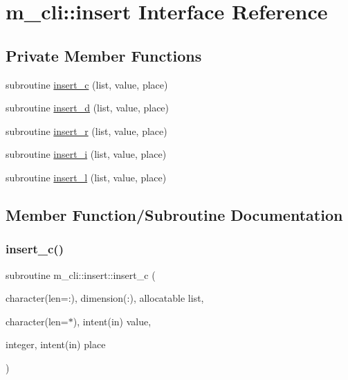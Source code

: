 \hypertarget{interfacem__cli_1_1insert}{}\section{m\+\_\+cli\+:\+:insert Interface Reference}
\label{interfacem__cli_1_1insert}
\subsection*{Private Member Functions}
\begin{DoxyCompactItemize}
\item 
subroutine \mbox{\hyperlink{interfacem__cli_1_1insert_aca6814eaf24391cb47c31596671d8475}{insert\+\_\+c}} (list, value, place)
\item 
subroutine \mbox{\hyperlink{interfacem__cli_1_1insert_a754e4845aabebdb9c34a928f49cdaa59}{insert\+\_\+d}} (list, value, place)
\item 
subroutine \mbox{\hyperlink{interfacem__cli_1_1insert_af953a8b23ca38f6a5e123d616ad80964}{insert\+\_\+r}} (list, value, place)
\item 
subroutine \mbox{\hyperlink{interfacem__cli_1_1insert_adc369899b95770d6a3e40b22945014d0}{insert\+\_\+i}} (list, value, place)
\item 
subroutine \mbox{\hyperlink{interfacem__cli_1_1insert_a058a7eb2f5a375bd7a27cabcba64c717}{insert\+\_\+l}} (list, value, place)
\end{DoxyCompactItemize}


\subsection{Member Function/\+Subroutine Documentation}
\mbox{\label{interfacem__cli_1_1insert_aca6814eaf24391cb47c31596671d8475}} 
\subsubsection{\texorpdfstring{insert\+\_\+c()}{insert\_c()}}
{\footnotesize\ttfamily subroutine m\+\_\+cli\+::insert\+::insert\+\_\+c (\begin{DoxyParamCaption}\item[{character(len=\+:), dimension(\+:), allocatable}]{list,  }\item[{character(len=$\ast$), intent(in)}]{value,  }\item[{integer, intent(in)}]{place }\end{DoxyParamCaption})\hspace{0.3cm}{\ttfamily [private]}}

